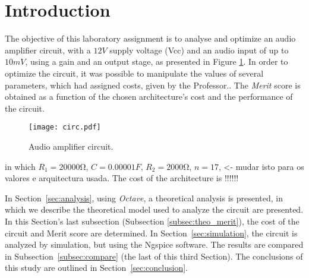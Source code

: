 \section{Introduction}
\label{sec:introduction}

The objective of this laboratory assignment is to analyse and optimize an audio amplifier circuit, with a $12V$ supply voltage (Vcc) and an audio input of up to $10mV$, using a gain and an output stage, as presented in Figure  \ref{fig:circ}. In order to optimize the circuit, it was possible to manipulate the values of several parameters, which had assigned costs, given by the Professor.. The \textit{Merit} score is obtained as a function of the chosen architecture's cost and the performance of the circuit. 


\begin{figure}[h] \centering
\texttt{[image: circ.pdf]}
\caption{Audio amplifier circuit.}
\label{fig:circ}
\end{figure}

in which $R_1 = 20000 \si{\ohm}$, $C=0.00001 F$, $R_2 = 2000 \si{\ohm}$, $n=17$, <- mudar isto para os valores e arquitectura usada.
The cost of the architecture is !!!!!!


In Section~\ref{sec:analysis}, using \textit{Octave}, a theoretical analysis is presented, in which we describe the theoretical model used to analyze the circuit are presented. In this Section's last subsection (Subsection \ref{subsec:theo_merit}), the cost of the circuit and Merit score are determined. In Section~\ref{sec:simulation}, the circuit is analyzed by simulation, but using the Ngspice software. The results are compared in Subsection~\ref{subsec:compare} (the last of this third Section). The conclusions of this study are outlined in Section~\ref{sec:conclusion}.
